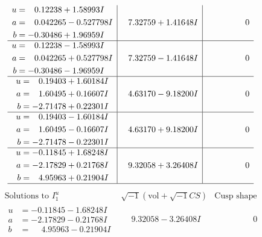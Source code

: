 \documentclass[1p]{elsarticle_modified}
\theoremstyle{definition}
\newcommand{\I}{\sqrt{-1}}
\begin{document}
$$\begin{array}{c|c|c}
\begin{aligned}
u &= \phantom{-}0.12238 + 1.58993 I \\
a &= \phantom{-}0.042265 - 0.527798 I \\
b &= -0.30486 + 1.96959 I\end{aligned}
 & \phantom{-}7.32759 + 1.41648 I & \phantom{-0.000000 } 0 \\ \hline\begin{aligned}
u &= \phantom{-}0.12238 - 1.58993 I \\
a &= \phantom{-}0.042265 + 0.527798 I \\
b &= -0.30486 - 1.96959 I\end{aligned}
 & \phantom{-}7.32759 - 1.41648 I & \phantom{-0.000000 } 0 \\ \hline\begin{aligned}
u &= \phantom{-}0.19403 + 1.60184 I \\
a &= \phantom{-}1.60495 + 0.16607 I \\
b &= -2.71478 + 0.22301 I\end{aligned}
 & \phantom{-}4.63170 - 9.18200 I & \phantom{-0.000000 } 0 \\ \hline\begin{aligned}
u &= \phantom{-}0.19403 - 1.60184 I \\
a &= \phantom{-}1.60495 - 0.16607 I \\
b &= -2.71478 - 0.22301 I\end{aligned}
 & \phantom{-}4.63170 + 9.18200 I & \phantom{-0.000000 } 0 \\ \hline\begin{aligned}
u &= -0.11845 + 1.68248 I \\
a &= -2.17829 + 0.21768 I \\
b &= \phantom{-}4.95963 + 0.21904 I\end{aligned}
 & \phantom{-}9.32058 + 3.26408 I & \phantom{-0.000000 } 0\\
 \hline 
 \end{array}$$\newpage$$\begin{array}{c|c|c}  
\text{Solutions to }I^u_{1}& \I (\text{vol} + \sqrt{-1}CS) & \text{Cusp shape}\\
 \hline 
\begin{aligned}
u &= -0.11845 - 1.68248 I \\
a &= -2.17829 - 0.21768 I \\
b &= \phantom{-}4.95963 - 0.21904 I\end{aligned}
 & \phantom{-}9.32058 - 3.26408 I & \phantom{-0.000000 } 0 \\ \hline\begin{aligned}

\end{aligned}
\end{array}$$
\end{document}

